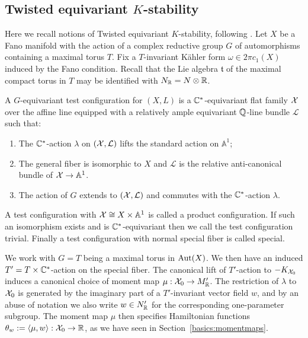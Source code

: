 \subsection{Twisted equivariant $K$-stability}
\label{prelim:twisted}
Here we recall notions of Twisted equivariant $K$-stability, following \cite{datar2016kahler}. Let \(X\) be a Fano manifold with the action of a complex reductive group \(G\) of automorphisms containing a maximal torus \(T\). Fix a \(T\)-invariant K\"ahler form \(\omega \in 2 \pi c_1(X)\) induced by the Fano condition. Recall that the Lie algebra \(\mathfrak{t}\) of the maximal compact torus in \(T\) may be identified with \(N_{\mathbb{R}} = N \otimes \mathbb{R}\).
\begin{definition}
A \(G\)-equivariant test configuration for \((X,L)\) is a \(\mathbb{C}^*\)-equivariant flat family \({\mathcal{X}}\) over the affine line equipped with a relatively ample equivariant \(\mathbb{Q}\)-line bundle \(\mathcal{L}\) such that:
\begin{enumerate}
\item The \(\mathbb{C}^*\)-action \(\lambda\) on \(({\mathcal{X}}, \mathcal{L})\) lifts the standard action on \(\mathbb{A}^1\);
\item The general fiber is isomorphic to \(X\) and \(\mathcal{L}\) is the relative anti-canonical bundle of \({\mathcal{X}} \to \mathbb{A}^1\).
\item The action of \(G\) extends to \(({\mathcal{X}},\mathcal{L})\) and commutes with the \(\mathbb{C}^*\)-action \(\lambda\).
\end{enumerate}
A test configuration with \({\mathcal{X}} \cong X \times \mathbb{A}^1\) is called a product configuration. If such an isomorphism exists and is \(\mathbb{C}^*\)-equivariant then we call the test configuration trivial. Finally a test configuration with normal special fiber is called special.
\end{definition}
We work with \(G = T\) being a maximal torus in \(\mathop{\rm Aut}\nolimits(X)\). We then have an induced \(T' = T \times \mathbb{C}^*\)-action on the special fiber. The canonical lift of \(T'\)-action to \(-K_{{\mathcal{X}}_0}\) induces a canonical choice of moment map \(\mu: {\mathcal{X}}_0 \to M_{\mathbb{R}}'\). The restriction of \(\lambda\) to \({\mathcal{X}}_0\) is generated by the imaginary part of a \(T'\)-invariant vector field \(w\), and by an abuse of notation we also write \(w \in N'_{\mathbb{R}}\) for the corresponding  one-parameter subgroup. The moment map \(\mu\) then specifies Hamiltonian functions \(\theta_w := \langle \mu, w \rangle: {\mathcal{X}}_0 \to \mathbb{R}  \), as we have seen in Section~\ref{basics:momentmaps}.

